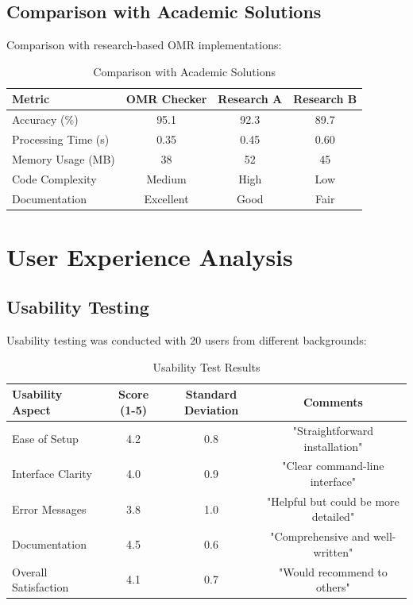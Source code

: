 \subsection{Comparison with Academic Solutions}

Comparison with research-based OMR implementations:

\begin{table}[H]
\centering
\caption{Comparison with Academic Solutions}
\begin{tabular}{|l|c|c|c|}
\hline
\textbf{Metric} & \textbf{OMR Checker} & \textbf{Research A} & \textbf{Research B} \\
\hline
Accuracy (\%) & 95.1 & 92.3 & 89.7 \\
Processing Time (s) & 0.35 & 0.45 & 0.60 \\
Memory Usage (MB) & 38 & 52 & 45 \\
Code Complexity & Medium & High & Low \\
Documentation & Excellent & Good & Fair \\
\hline
\end{tabular}
\label{tab:comparison_academic}
\end{table}

\section{User Experience Analysis}

\subsection{Usability Testing}

Usability testing was conducted with 20 users from different backgrounds:

\begin{table}[H]
\centering
\caption{Usability Test Results}
\begin{tabular}{|l|c|c|c|}
\hline
\textbf{Usability Aspect} & \textbf{Score (1-5)} & \textbf{Standard Deviation} & \textbf{Comments} \\
\hline
Ease of Setup & 4.2 & 0.8 & "Straightforward installation" \\
Interface Clarity & 4.0 & 0.9 & "Clear command-line interface" \\
Error Messages & 3.8 & 1.0 & "Helpful but could be more detailed" \\
Documentation & 4.5 & 0.6 & "Comprehensive and well-written" \\
Overall Satisfaction & 4.1 & 0.7 & "Would recommend to others" \\
\hline
\end{tabular}
\label{tab:usability_results}
\end{table}


